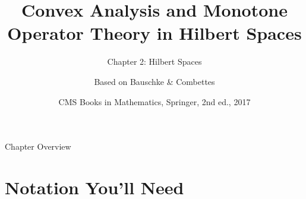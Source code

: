 \documentclass[aspectratio=169,10pt]{beamer}
\title[Convex Analysis \& MOT -- Ch.2]{Convex Analysis and Monotone Operator Theory in Hilbert Spaces}
\subtitle{Chapter 2: Hilbert Spaces}
\author{Based on Bauschke \& Combettes}
\date{CMS Books in Mathematics, Springer, 2nd ed., 2017}
\begin{document}
\begin{frame}
  \titlepage
\end{frame}

\begin{frame}{Chapter Overview}
  \tableofcontents
\end{frame}


\section{Notation You'll Need}
\end{document}
